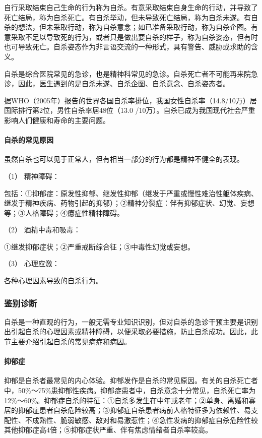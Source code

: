 自行采取结束自己生命的行为称为自杀。有意采取结束自身生命的行动，并导致了死亡结局，称为自杀死亡。有自杀举动，但未导致死亡结局，称为自杀未遂。有自杀的想法，但未采取行动，称为自杀意念；如已准备采取行动，称为自杀企图。有意采取不足以导致死的行为，或者只是做出要自杀的样子，称为自杀姿态，但有时也可导致死亡。自杀姿态作为非言语交流的一种形式，具有警告、威胁或求助的含义。

自杀是综合医院常见的急诊，也是精神科常见的急诊。自杀死亡者不可能再来院急诊，因此，医生遇到的是自杀未遂、自杀企图、自杀意念、自杀姿态者。

据WHO（2005年）报告的世界各国自杀率排位，我国女性自杀率（14.8/10万）居国际排行第2位，男性自杀率居48位（13.0
/10万）。自杀已成为我国现代社会严重影响人们健康和寿命的主要问题。

\paragraph{自杀的常见原因}

虽然自杀也可以见于正常人，但有相当一部分的行为都是精神不健全的表现。

\hypertarget{text00052.htmlux5cux23CHP1-18-10-1-2-1}{}
（1） 精神障碍：

包括：①抑郁症：原发性抑郁、继发性抑郁（继发于严重或慢性难治性躯体疾病、继发于精神疾病、药物引起的抑郁）；②精神分裂症：伴有抑郁症状、幻觉、妄想等；③人格障碍；④癔症性精神障碍。

\hypertarget{text00052.htmlux5cux23CHP1-18-10-1-2-2}{}
（2） 酒精中毒和吸毒：

①继发抑郁症状；②严重戒断综合征；③中毒性幻觉或妄想。

\hypertarget{text00052.htmlux5cux23CHP1-18-10-1-2-3}{}
（3） 心理应激：

各种心理因素导致的自杀行为。

\subsubsection{鉴别诊断}

自杀是一种直观的行为，一般无需专业知识识别，但对自杀的急诊干预主要是识别出引起自杀的心理因素或精神障碍，以便采取必要措施，防止自杀成功。因此，此节主要介绍引起自杀的常见病症和病因。

\paragraph{抑郁症}

抑郁是自杀者最常见的内心体验。抑郁发作是自杀的常见原因。有关的自杀死亡者中，50\%～75\%患抑郁性疾病。抑郁症患者中，自杀意念十分常见，自杀死亡率为12\%～60\%。抑郁症自杀的特征：①自杀多发生在中年或老年；②单身、离婚和寡居的抑郁症患者自杀危险较高；③抑郁症自杀患者病前人格特征多为依赖性、易支配性、不成熟性、脆弱敏感、敌对和易激惹性；④急性发病的抑郁症自杀危险性较其他抑郁症高4倍；⑤抑郁症状严重、伴有焦虑情绪者自杀率较高。

